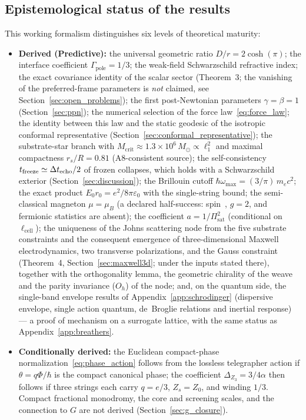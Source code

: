 \documentclass[11pt,a4paper]{article}
\theoremstyle{plain}
\theoremstyle{remark}
\begin{document}
\subsection*{Epistemological status of the results}
This working formalism distinguishes six levels of theoretical maturity:
\begin{itemize}
    \item \textbf{Derived (Predictive):} the universal geometric ratio $D/r = 2\cosh(\pi)$; the interface coefficient $\Gamma_{\text{pole}} = 1/3$; the weak-field Schwarzschild refractive index; the exact covariance identity of the scalar sector (Theorem~3; the vanishing of the preferred-frame parameters is \emph{not} claimed, see Section~\ref{sec:open_problems}); the first post-Newtonian parameters $\gamma = \beta = 1$ (Section~\ref{sec:ppn}); the numerical selection of the force law~\eqref{eq:force_law}; the identity between this law and the static geodesic of the isotropic conformal representative (Section~\ref{sec:conformal_representative}); the substrate-star branch with $M_{\text{crit}} \approx 1.3\times10^{6}\,M_\odot \propto \ell_1^2$ and maximal compactness $r_s/R = 0.81$ (A8-consistent source); the self-consistency $t_{\rm freeze} \simeq \Delta t_{\rm echo}/2$ of frozen collapses, which holds with a Schwarzschild exterior (Section~\ref{sec:discussion}); the Brillouin cutoff $\hbar\omega_{\max} = (3/\pi)\,m_ec^2$; the exact product $E_0 r_0 = e^2/8\pi\varepsilon_0$ with the single-string bound; the semi-classical magneton $\mu = \mu_B$ (a declared half-success: spin~\textonehalf, $g = 2$, and fermionic statistics are absent); the coefficient $a = 1/\Pi_{\text{sat}}^2$ (conditional on $\ell_{\text{cell}}$); the uniqueness of the Johns scattering node from the five substrate constraints and the consequent emergence of three-dimensional Maxwell electrodynamics, two transverse polarizations, and the Gauss constraint (Theorem~4, Section~\ref{sec:maxwell3d}; under the inputs stated there), together with the orthogonality lemma, the geometric chirality of the weave and the parity invariance ($O_h$) of the node; and, on the quantum side, the single-band envelope results of Appendix~\ref{app:schrodinger} (dispersive envelope, single action quantum, de~Broglie relations and inertial response) --- a proof of mechanism on a surrogate lattice, with the same status as Appendix~\ref{app:breathers}.
    \item \textbf{Conditionally derived:} the Euclidean compact-phase normalization~\eqref{eq:phase_action} follows from the lossless telegrapher action if $\theta=q\Phi/\hbar$ is the compact canonical phase; the coefficient $\Delta_{Z_3}=3/4\alpha$ then follows if three strings each carry $q=e/3$, $Z_s=Z_0$, and winding $1/3$. Compact fractional monodromy, the core and screening scales, and the connection to $G$ are not derived (Section~\ref{sec:g_closure}).

\end{itemize}
\end{document}
